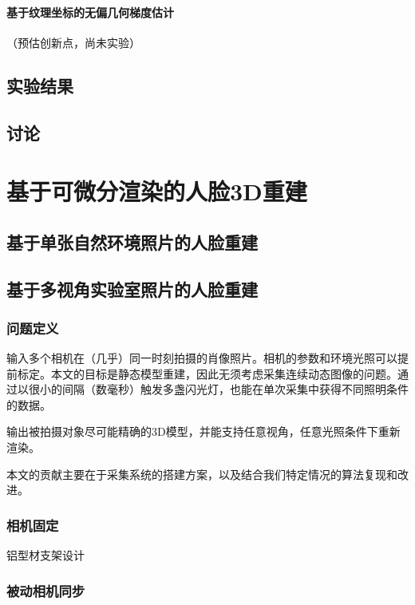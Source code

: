 \documentclass{ctexart}
\begin{document}
\paragraph{基于纹理坐标的无偏几何梯度估计}（预估创新点，尚未实验）

\subsection{实验结果}

\subsection{讨论}

\section{基于可微分渲染的人脸3D重建}

\subsection{基于单张自然环境照片的人脸重建}

\subsection{基于多视角实验室照片的人脸重建}

\subsubsection{问题定义}

输入多个相机在（几乎）同一时刻拍摄的肖像照片。相机的参数和环境光照可以提前标定。本文的目标是静态模型重建，因此无须考虑采集连续动态图像的问题。通过以很小的间隔（数毫秒）触发多盏闪光灯，也能在单次采集中获得不同照明条件的数据。

输出被拍摄对象尽可能精确的3D模型，并能支持任意视角，任意光照条件下重新渲染。

本文的贡献主要在于采集系统的搭建方案，以及结合我们特定情况的算法复现和改进。

\subsubsection{相机固定}

铝型材支架设计

\subsubsection{被动相机同步}
\label{sec:passive_sync}
\end{document}
